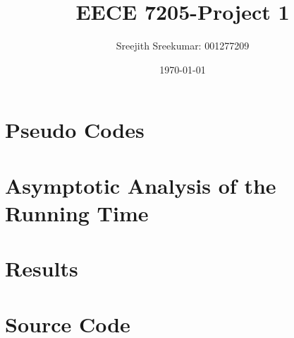 \documentclass{article}
\title{EECE 7205-Project 1}
\author{Sreejith Sreekumar: 001277209}
\date{\today}
\begin{document}
\maketitle
\section{Pseudo Codes}

\section{Asymptotic Analysis of the Running Time}

\section{Results}

\section{Source Code}
\end{document}
